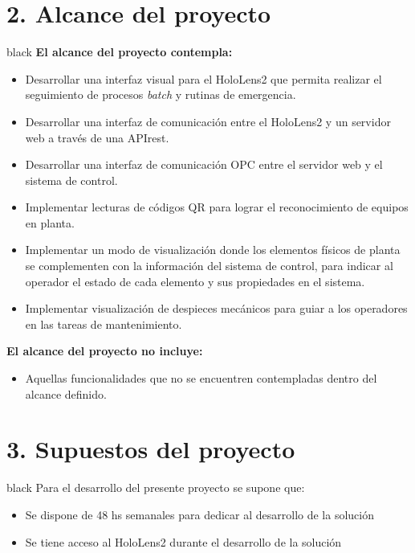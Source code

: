 \documentclass[11pt]{charter}
\begin{document}
\section{2. Alcance del proyecto}
\label{sec:alcance}

\begin{consigna}{black}
\textbf{El alcance del proyecto contempla:}
\begin{itemize}
\item Desarrollar una interfaz visual para el HoloLens2 que permita realizar el seguimiento de procesos \textit{batch} y rutinas de emergencia.
\item Desarrollar una interfaz de comunicación entre el HoloLens2 y un servidor web a través de una APIrest.
\item Desarrollar una interfaz de comunicación OPC entre el servidor web y el sistema de control.
\item Implementar lecturas de códigos QR para lograr el reconocimiento de equipos en planta.
\item Implementar un modo de visualización donde los elementos físicos de planta se complementen con la información del sistema de control, para indicar al operador el estado de cada elemento y sus propiedades en el sistema.
\item Implementar visualización de despieces mecánicos para guiar a los operadores en las tareas de mantenimiento.
\end{itemize}

\textbf{El alcance del proyecto no incluye:}
\begin{itemize}
\item Aquellas funcionalidades que no se encuentren contempladas dentro del alcance definido.
\end{itemize}
\end{consigna}


\section{3. Supuestos del proyecto}
\label{sec:supuestos}

\begin{consigna}{black}
Para el desarrollo del presente proyecto se supone que:

\begin{itemize}
\item Se dispone de 48 hs semanales para dedicar al desarrollo de la solución
\item Se tiene acceso al HoloLens2 durante el desarrollo de la solución
\end{itemize}

\end{consigna}
\end{document}

